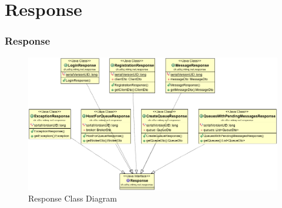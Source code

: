 \documentclass{beamer}
\begin{document}
\section{Response}
\begin{frame}
\frametitle{Response}

\begin{figure}
  \begin{center}
    \includegraphics[scale=0.33]{../../class_diagrams/Response.png}
  \end{center}
  \caption{Response Class Diagram}
  \label{fig:db-schema}
\end{figure}

\end{frame}
\end{document}
